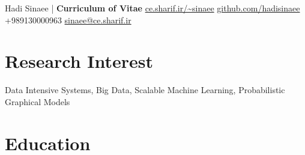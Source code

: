 \documentclass[10pt,a4paper,roman]{moderncv}        %
\begin{document}
\def\mediumSpace{1.1em}
\def\shortSpace{.6em}

{\color{black} \Huge Hadi Sinaee |}  {\color{grey} \Huge{\textbf{Curriculum of Vitae}}}
\newline
\faGlobe \space \href{ce.sharif.ir/~sinaee}{ce.sharif.ir/\textasciitilde sinaee} 
\quad \faGithub \space \href{https://github.com/hadisinaee}{github.com/hadisinaee}
\quad \faMobile \space +989130000963
\quad \faEnvelope \space \href{mailto:sinaee@ce.sharif.ir?Subject=Hello Hadi!}{sinaee@ce.sharif.ir}

\medskip
\medskip

\section{Research Interest}
Data Intensive Systems, Big Data, Scalable Machine Learning, Probabilistic Graphical Models



\section{Education}

\newcommand{\RNum}[1]{\uppercase\expandafter{\romannumeral #1\relax}}

\end{document}
